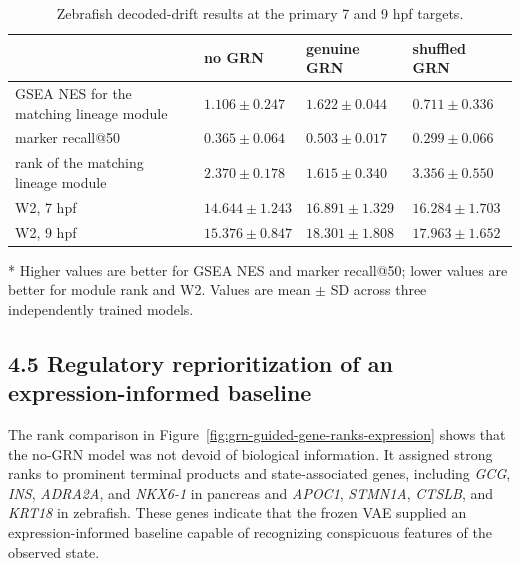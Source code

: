 \documentclass[
  11pt,
  letterpaper,
]{article}
\begin{document}
\begin{table}[H]
\caption{Zebrafish decoded-drift results at the primary 7 and 9 hpf
targets.}
\label{tab:zebrafish-results}

\begin{center}
\begin{tabularx}{\textwidth}{@{}>{\raggedright\arraybackslash}X
  >{\centering\arraybackslash}p{}
  >{\centering\arraybackslash}p{}
  >{\centering\arraybackslash}p{}@{}}
\toprule
 & no GRN & genuine GRN & shuffled GRN \\
\midrule
GSEA NES for the matching lineage module & \mbox{\(1.106 \pm 0.247\)} & \mbox{\(\mathbf{1.622 \pm 0.044}\)} & \mbox{\(0.711 \pm 0.336\)} \\
marker recall@50 & \mbox{\(0.365 \pm 0.064\)} & \mbox{\(\mathbf{0.503 \pm 0.017}\)} & \mbox{\(0.299 \pm 0.066\)} \\
rank of the matching lineage module & \mbox{\(2.370 \pm 0.178\)} & \mbox{\(\mathbf{1.615 \pm 0.340}\)} & \mbox{\(3.356 \pm 0.550\)} \\
W2, 7 hpf & \mbox{\(\mathbf{14.644 \pm 1.243}\)} & \mbox{\(16.891 \pm 1.329\)} & \mbox{\(16.284 \pm 1.703\)} \\
W2, 9 hpf & \mbox{\(\mathbf{15.376 \pm 0.847}\)} & \mbox{\(18.301 \pm 1.808\)} & \mbox{\(17.963 \pm 1.652\)} \\
\bottomrule
\end{tabularx}
\end{center}

* Higher values are better for GSEA NES and marker recall@50; lower
values are better for module rank and W2. Values are mean \(\pm\) SD
across three independently trained models.
\end{table}

\subsection{4.5 Regulatory reprioritization of an expression-informed
baseline}\label{regulatory-reprioritization-of-an-expression-informed-baseline}

The rank comparison in Figure~\ref{fig:grn-guided-gene-ranks-expression}
shows that the no-GRN model was not devoid of biological information.
It assigned strong ranks to prominent terminal products and
state-associated genes, including \emph{GCG}, \emph{INS}, \emph{ADRA2A},
and \emph{NKX6-1} in pancreas and \emph{APOC1}, \emph{STMN1A},
\emph{CTSLB}, and \emph{KRT18} in zebrafish. These genes indicate that
the frozen VAE supplied an expression-informed baseline capable of
recognizing conspicuous features of the observed state.
\end{document}
